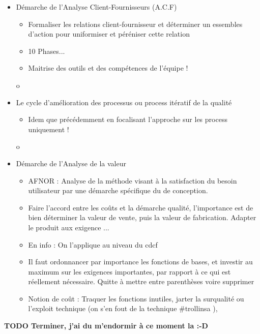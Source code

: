 \begin{itemize}
	\item Démarche de l’Analyse Client-Fournisseurs (A.C.F)
	\begin{itemize}
		\item Formaliser les relations client-fournisseur et déterminer un essembles d’action pour uniformiser et péréniser cette relation
		\item 10 Phases...
		\item  Maitrise des outils et des compétences de l’équipe !
	\end{itemize}

o

	\item Le cycle d’amélioration des processus ou process itératif de la qualité
	\begin{itemize}
		\item Idem que précédemment en focalisant l’approche sur les process uniquement !
	\end{itemize}

o

	\item Démarche de l’Analyse de la valeur
	\begin{itemize}
		\item AFNOR : Analyse de la méthode visant à la satisfaction du besoin utilisateur par une démarche spécifique du de conception.
		\item Faire l’accord entre les coûts et la démarche qualité, l’importance est de bien déterminer la valeur de vente, puis la valeur de fabrication. Adapter le produit aux exigence ...
		\item En info : On l’applique au niveau du cdcf
		\item Il faut ordonnancer par importance les fonctions de bases, et investir au maximum sur les exigences importantes, par rapport à ce qui est réellement nécessaire. Quitte à mettre entre parenthèses voire supprimer
		\item Notion de coût : Traquer les fonctions inutiles, jarter la surqualité ou l’exploit technique (on s’en fout de la technique #trollinsa ),
	\end{itemize}

\end{itemize}

   
\textbf{TODO Terminer, j’ai du m’endormir à ce moment la :-D}
